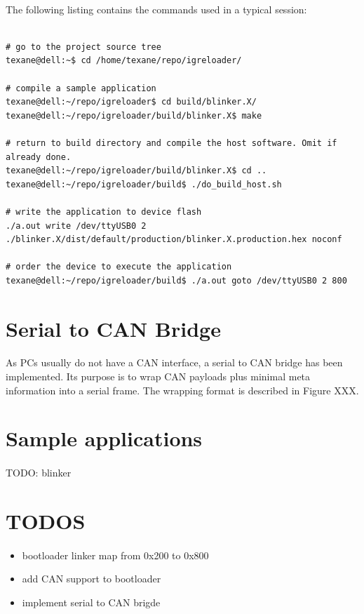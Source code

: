 \documentclass[a4paper, 11pt]{article}
\begin{document}
\paragraph{}
The following listing contains the commands used in a typical session:
\begin{tiny}
\begin{lstlisting}[frame=tb]

# go to the project source tree
texane@dell:~$ cd /home/texane/repo/igreloader/

# compile a sample application
texane@dell:~/repo/igreloader$ cd build/blinker.X/
texane@dell:~/repo/igreloader/build/blinker.X$ make

# return to build directory and compile the host software. Omit if already done.
texane@dell:~/repo/igreloader/build/blinker.X$ cd ..
texane@dell:~/repo/igreloader/build$ ./do_build_host.sh

# write the application to device flash
./a.out write /dev/ttyUSB0 2 ./blinker.X/dist/default/production/blinker.X.production.hex noconf

# order the device to execute the application
texane@dell:~/repo/igreloader/build$ ./a.out goto /dev/ttyUSB0 2 800
\end{lstlisting}
\end{tiny}


\newpage
\section{Serial to CAN Bridge}
\paragraph{}
As PCs usually do not have a CAN interface, a serial to CAN bridge has been implemented. Its purpose is to
wrap CAN payloads plus minimal meta information into a serial frame. The wrapping format is described in
Figure XXX.


\newpage
\section{Sample applications}
\paragraph{}
TODO: blinker


\newpage
\section{TODOS}
\paragraph{}
\begin{itemize}
\item bootloader linker map from 0x200 to 0x800
\item add CAN support to bootloader
\item implement serial to CAN brigde
\end{itemize}
\end{document}
